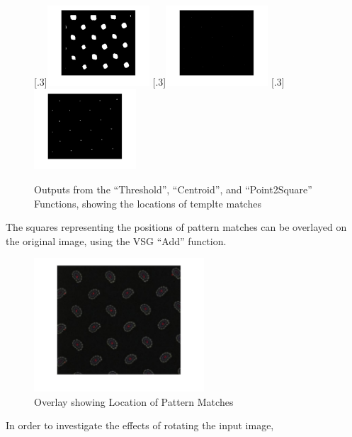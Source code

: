\documentclass[a4paper]{article}
\begin{document}
	\begin{figure}[H]
		\centering
		[.3\linewidth]{\includegraphics[height=3cm]{Results/Q3/a/qaThresh.jpg}}%
		[.3\linewidth]{\includegraphics[height=3cm]{Results/Q3/a/qaCentroid.jpg}}%
		[.3\linewidth]{\includegraphics[height=3cm]{Results/Q3/a/qaP2S.jpg}}%
		\caption{Outputs from the ``Threshold'', ``Centroid'', and
		``Point2Square'' Functions, showing the locations of templte
	matches}
		\label{fig:}
	\end{figure}
	\par The squares representing the positions of pattern matches can be
	overlayed on the original image, using the VSG ``Add'' function.
	\begin{figure}[H]
		\centering
		\includegraphics[height=5cm]{Results/Q3/a/qaOverlay.jpg}%
		\caption{Overlay showing Location of Pattern Matches}
		\label{fig:}
	\end{figure}
	\par In order to investigate the effects of rotating the input image,
\end{document}
